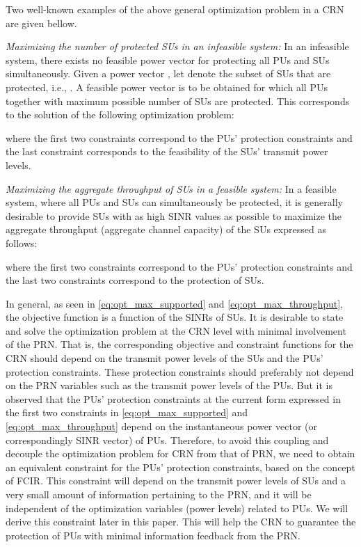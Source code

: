 \documentclass[journal,twoside]{IEEEtran}
\begin{document}
		Two well-known examples of the above general optimization problem in a CRN are given bellow.
		
		\textit{Maximizing the number of protected SUs in an infeasible system:}
		In an infeasible system, there exists no feasible power vector for protecting all PUs and SUs simultaneously. Given a power vector , let  denote the subset of SUs that are protected, i.e., .
		A feasible power vector  is to be obtained for which all PUs together with maximum possible number of SUs are protected. This corresponds to the solution of the following optimization problem:

		where the first two constraints correspond to the PUs' protection constraints and the last constraint corresponds to the feasibility of the SUs' transmit power levels.
	
		\textit{Maximizing the aggregate throughput of SUs in a feasible system: }
		In a feasible system, where all PUs and SUs can simultaneously be protected, it is generally desirable to provide SUs with as high SINR values as possible to maximize the aggregate throughput (aggregate channel capacity) of the SUs expressed as follows:

		where the first two constraints correspond to the PUs' protection constraints and the last two constraints correspond to the protection of SUs. 
	

	In general, as seen in \eqref{eq:opt_max_supported} and \eqref{eq:opt_max_throughput}, the objective function is  a function of the SINRs of SUs. It is desirable to state and solve the optimization problem at the CRN level with minimal involvement of the PRN. That is, the corresponding objective and constraint functions for the CRN should depend on the transmit power levels of the SUs and the PUs' protection constraints. These protection constraints should preferably not depend on the PRN  variables such as the  transmit power levels of the PUs. 
	But it is observed that the PUs' protection constraints at the current form expressed in the  first two constraints in \eqref{eq:opt_max_supported} and \eqref{eq:opt_max_throughput} depend on the instantaneous power vector (or correspondingly SINR vector) of PUs.
	Therefore, to avoid this coupling and decouple the optimization problem for CRN from that of PRN,
we	need to obtain an equivalent constraint for the PUs' protection constraints, based on the concept of FCIR. This constraint will depend on the transmit power levels of SUs and a very small amount of information pertaining to the PRN, and it will be independent of the optimization variables (power levels) related to PUs. We will derive this constraint later in this paper. This will help the CRN to guarantee the protection of PUs with minimal information feedback from the PRN. 
	
\end{document}
